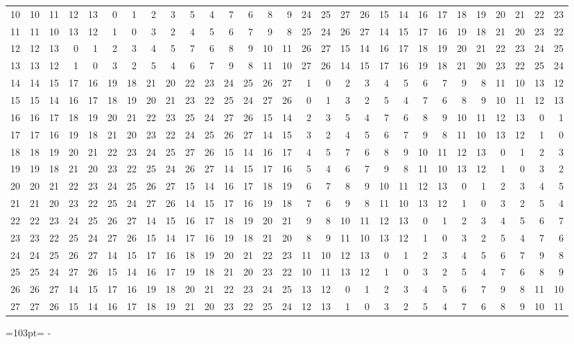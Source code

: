 \documentclass[10pt,a4paper]{article}
\newcommand{\needspace}[1]{\par\penalty-100\begingroup\dimen0=#1\relax\dimen2=\pagegoal
  \advance\dimen2-\pagetotal\ifdim\dimen0>\dimen2\relax\ifdim\dimen2>0pt\vfil\break\fi\fi
  \endgroup}
\numberwithin{equation}{section}
\begin{document}
{\begin{longtable}{@{}r|rrrrrrrrrrrrrrrrrrrrrrrrrrrr@{}}
10 & 10 & 11 & 12 & 13 & 0 & 1 & 2 & 3 & 5 & 4 & 7 & 6 & 8 & 9 & 24 & 25 & 27 & 26 & 15 & 14 & 16 & 17 & 18 & 19 & 20 & 21 & 22 & 23\\
11 & 11 & 10 & 13 & 12 & 1 & 0 & 3 & 2 & 4 & 5 & 6 & 7 & 9 & 8 & 25 & 24 & 26 & 27 & 14 & 15 & 17 & 16 & 19 & 18 & 21 & 20 & 23 & 22\\
12 & 12 & 13 & 0 & 1 & 2 & 3 & 4 & 5 & 7 & 6 & 8 & 9 & 10 & 11 & 26 & 27 & 15 & 14 & 16 & 17 & 18 & 19 & 20 & 21 & 22 & 23 & 24 & 25\\
13 & 13 & 12 & 1 & 0 & 3 & 2 & 5 & 4 & 6 & 7 & 9 & 8 & 11 & 10 & 27 & 26 & 14 & 15 & 17 & 16 & 19 & 18 & 21 & 20 & 23 & 22 & 25 & 24\\
14 & 14 & 15 & 17 & 16 & 19 & 18 & 21 & 20 & 22 & 23 & 24 & 25 & 26 & 27 & 1 & 0 & 2 & 3 & 4 & 5 & 6 & 7 & 9 & 8 & 11 & 10 & 13 & 12\\
15 & 15 & 14 & 16 & 17 & 18 & 19 & 20 & 21 & 23 & 22 & 25 & 24 & 27 & 26 & 0 & 1 & 3 & 2 & 5 & 4 & 7 & 6 & 8 & 9 & 10 & 11 & 12 & 13\\
16 & 16 & 17 & 18 & 19 & 20 & 21 & 22 & 23 & 25 & 24 & 27 & 26 & 15 & 14 & 2 & 3 & 5 & 4 & 7 & 6 & 8 & 9 & 10 & 11 & 12 & 13 & 0 & 1\\
17 & 17 & 16 & 19 & 18 & 21 & 20 & 23 & 22 & 24 & 25 & 26 & 27 & 14 & 15 & 3 & 2 & 4 & 5 & 6 & 7 & 9 & 8 & 11 & 10 & 13 & 12 & 1 & 0\\
18 & 18 & 19 & 20 & 21 & 22 & 23 & 24 & 25 & 27 & 26 & 15 & 14 & 16 & 17 & 4 & 5 & 7 & 6 & 8 & 9 & 10 & 11 & 12 & 13 & 0 & 1 & 2 & 3\\
19 & 19 & 18 & 21 & 20 & 23 & 22 & 25 & 24 & 26 & 27 & 14 & 15 & 17 & 16 & 5 & 4 & 6 & 7 & 9 & 8 & 11 & 10 & 13 & 12 & 1 & 0 & 3 & 2\\
20 & 20 & 21 & 22 & 23 & 24 & 25 & 26 & 27 & 15 & 14 & 16 & 17 & 18 & 19 & 6 & 7 & 8 & 9 & 10 & 11 & 12 & 13 & 0 & 1 & 2 & 3 & 4 & 5\\
21 & 21 & 20 & 23 & 22 & 25 & 24 & 27 & 26 & 14 & 15 & 17 & 16 & 19 & 18 & 7 & 6 & 9 & 8 & 11 & 10 & 13 & 12 & 1 & 0 & 3 & 2 & 5 & 4\\
22 & 22 & 23 & 24 & 25 & 26 & 27 & 14 & 15 & 16 & 17 & 18 & 19 & 20 & 21 & 9 & 8 & 10 & 11 & 12 & 13 & 0 & 1 & 2 & 3 & 4 & 5 & 6 & 7\\
23 & 23 & 22 & 25 & 24 & 27 & 26 & 15 & 14 & 17 & 16 & 19 & 18 & 21 & 20 & 8 & 9 & 11 & 10 & 13 & 12 & 1 & 0 & 3 & 2 & 5 & 4 & 7 & 6\\
24 & 24 & 25 & 26 & 27 & 14 & 15 & 17 & 16 & 18 & 19 & 20 & 21 & 22 & 23 & 11 & 10 & 12 & 13 & 0 & 1 & 2 & 3 & 4 & 5 & 6 & 7 & 9 & 8\\
25 & 25 & 24 & 27 & 26 & 15 & 14 & 16 & 17 & 19 & 18 & 21 & 20 & 23 & 22 & 10 & 11 & 13 & 12 & 1 & 0 & 3 & 2 & 5 & 4 & 7 & 6 & 8 & 9\\
26 & 26 & 27 & 14 & 15 & 17 & 16 & 19 & 18 & 20 & 21 & 22 & 23 & 24 & 25 & 13 & 12 & 0 & 1 & 2 & 3 & 4 & 5 & 6 & 7 & 9 & 8 & 11 & 10\\*
27 & 27 & 26 & 15 & 14 & 16 & 17 & 18 & 19 & 21 & 20 & 23 & 22 & 25 & 24 & 12 & 13 & 1 & 0 & 3 & 2 & 5 & 4 & 7 & 6 & 8 & 9 & 10 & 11\\
\bottomrule\end{longtable}}
\needspace{103pt}
\end{document}
